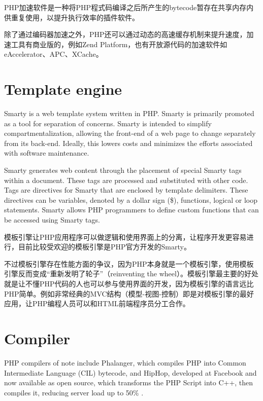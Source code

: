 PHP加速软件是一种将PHP程式码编译之后所产生的bytecode暂存在共享内存内供重复使用，以提升执行效率的插件软件。

除了通过编码器加速之外，PHP还可以通过动态的高速缓存机制来提升速度，加速工具有商业版的，例如Zend Platform，也有开放源代码的加速软件如eAccelerator、APC、XCache。










\section{Template engine}

Smarty is a web template system written in PHP. Smarty is primarily promoted as a tool for separation of concerns. Smarty is intended to simplify compartmentalization, allowing the front-end of a web page to change separately from its back-end. Ideally, this lowers costs and minimizes the efforts associated with software maintenance.

Smarty generates web content through the placement of special Smarty tags within a document. These tags are processed and substituted with other code. Tags are directives for Smarty that are enclosed by template delimiters. These directives can be variables, denoted by a dollar sign (\$), functions, logical or loop statements. Smarty allows PHP programmers to define custom functions that can be accessed using Smarty tags.

模板引擎让PHP应用程序可以做逻辑和使用界面上的分离，让程序开发更容易进行，目前比较受欢迎的模板引擎是PHP官方开发的Smarty\cite{smarty}。

不过模板引擎存在性能方面的争议，因为PHP本身就是一个模板引擎，使用模板引擎反而变成“重新发明了轮子”（reinventing the wheel）。模板引擎最主要的好处就是让不懂PHP代码的人也可以参与使用界面的开发，因为模板引擎的语言远比PHP简单。例如非常经典的MVC结构（模型-视图-控制）即是对模板引擎的最好应用，让PHP编程人员可以和HTML前端程序员分工合作。

\section{Compiler}


PHP compilers of note include Phalanger, which compiles PHP into Common Intermediate Language (CIL) bytecode, and HipHop, developed at Facebook and now available as open source, which transforms the PHP Script into C++, then compiles it, reducing server load up to 50\% .

